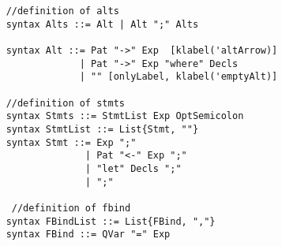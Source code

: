 \begin{lstlisting}
    //definition of alts
    syntax Alts ::= Alt | Alt ";" Alts

    syntax Alt ::= Pat "->" Exp  [klabel('altArrow)]
                 | Pat "->" Exp "where" Decls
                 | "" [onlyLabel, klabel('emptyAlt)]

    //definition of stmts
    syntax Stmts ::= StmtList Exp OptSemicolon
    syntax StmtList ::= List{Stmt, ""}
    syntax Stmt ::= Exp ";"
                  | Pat "<-" Exp ";"
                  | "let" Decls ";"
                  | ";"

     //definition of fbind
    syntax FBindList ::= List{FBind, ","}
    syntax FBind ::= QVar "=" Exp
\end{lstlisting}